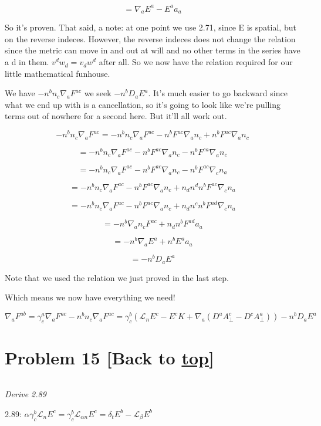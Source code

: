 \documentclass[landscape,letterpaper,10pt,english]{article}
\begin{document}
\[ = \nabla_a E^a - E^a a_a \]

So it's proven. That said, a note: at one point we use 2.71, since E is
spatial, but on the reverse indeces. However, the reverse indeces does
not change the relation since the metric can move in and out at will and
no other terms in the series have a d in them. \(v^dw_d = v_dw^d\) after
all. So we now have the relation required for our little mathematical
funhouse.

    We have \(- n^bn_c\nabla_aF^{ac}\) we seek \(-n^b D_a E^a\). It's much
easier to go backward since what we end up with is a cancellation, so
it's going to look like we're pulling terms out of nowhere for a second
here. But it'll all work out.

\[ - n^bn_c\nabla_aF^{ac} = - n^bn_c\nabla_aF^{ac} -n^b F^{ac} \nabla_a n_c + n^b F^{ac} \nabla_a n_c  \]

\[ = - n^bn_c\nabla_aF^{ac} -n^b F^{ac} \nabla_a n_c - n^b F^{ca} \nabla_a n_c \]

\[ = - n^bn_c\nabla_aF^{ac} -n^b F^{ac} \nabla_a n_c - n^b F^{ac} \nabla_c n_a \]

\[ = - n^bn_c\nabla_aF^{ac} -n^b F^{ac} \nabla_a n_c + n_d n^d n^b F^{ac} \nabla_c n_a \]

\[ = - n^bn_c\nabla_aF^{ac} -n^b F^{ac} \nabla_a n_c + n_d n^c n^b F^{ad} \nabla_c n_a \]

\[ = - n^b  \nabla_a n_c F^{ac} + n_d n^b F^{ad} a_a\]

\[ = - n^b \nabla_a E^a + n^b E^a a_a\]

\[ = - n^b D_a E^a \]

Note that we used the relation we just proved in the last step.

    Which means we now have everything we need!

\[\nabla_a F^{ab} = \gamma^a_c \nabla_a F^{ac} - n^bn_c\nabla_aF^{ac} = \gamma^b_c (\mathcal{L}_n E^c - E^c K + \nabla_a (D^a A^c_\perp - D^c A^a_\perp)) - n^b D_a E^a \]

    \hypertarget{problem-15-back-to-top}{%
\section{\texorpdfstring{Problem 15 {[}Back to
\hyperref[toc]{top}{]}}{Problem 15 {[}Back to {]}}}\label{problem-15-back-to-top}}

\[\label{P15}\]

\emph{Derive 2.89}

2.89:
\(\alpha \gamma^b_c \mathcal{L}_n E^c = \gamma^b_c \mathcal{L}_{\alpha n} E^c = \delta_t E^b - \mathcal{L}_\beta E^b\)
\end{document}
